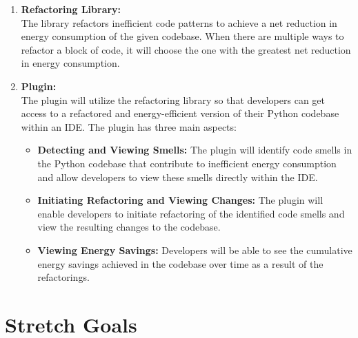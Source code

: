 \documentclass{article}
\begin{document}
\begin{enumerate}
  \item \textbf{Refactoring Library:} \\
    The library refactors inefficient code patterns to achieve a net
    reduction in energy consumption of the given codebase. When there
    are multiple ways to refactor a block of code, it will choose the
    one with the greatest net reduction in energy consumption.

  \item \textbf{Plugin:} \\
    The plugin will utilize the refactoring library so that
    developers can get access to a refactored and energy-efficient
    version of their Python codebase within an IDE. The plugin has
    three main aspects:

    \begin{itemize}
      \item \textbf{Detecting and Viewing Smells:} The plugin will
        identify code smells in the Python codebase that contribute
        to inefficient energy consumption and allow developers to
        view these smells directly within the IDE.
      \item \textbf{Initiating Refactoring and Viewing Changes:} The
        plugin will enable developers to initiate refactoring of the
        identified code smells and view the resulting changes to the codebase.
      \item \textbf{Viewing Energy Savings:} Developers will be able
        to see the cumulative energy savings achieved in the codebase
        over time as a result of the refactorings.
    \end{itemize}
\end{enumerate}

\section{Stretch Goals}
\end{document}
